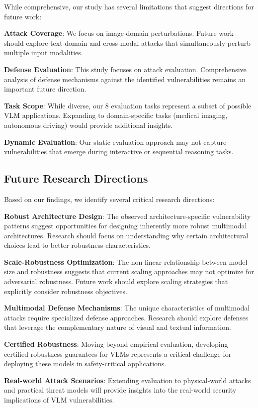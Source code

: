 While comprehensive, our study has several limitations that suggest directions for future work:

\textbf{Attack Coverage}: We focus on image-domain perturbations. Future work should explore text-domain and cross-modal attacks that simultaneously perturb multiple input modalities.

\textbf{Defense Evaluation}: This study focuses on attack evaluation. Comprehensive analysis of defense mechanisms against the identified vulnerabilities remains an important future direction.

\textbf{Task Scope}: While diverse, our 8 evaluation tasks represent a subset of possible VLM applications. Expanding to domain-specific tasks (medical imaging, autonomous driving) would provide additional insights.

\textbf{Dynamic Evaluation}: Our static evaluation approach may not capture vulnerabilities that emerge during interactive or sequential reasoning tasks.

\subsection{Future Research Directions}

Based on our findings, we identify several critical research directions:

\textbf{Robust Architecture Design}: The observed architecture-specific vulnerability patterns suggest opportunities for designing inherently more robust multimodal architectures. Research should focus on understanding why certain architectural choices lead to better robustness characteristics.

\textbf{Scale-Robustness Optimization}: The non-linear relationship between model size and robustness suggests that current scaling approaches may not optimize for adversarial robustness. Future work should explore scaling strategies that explicitly consider robustness objectives.

\textbf{Multimodal Defense Mechanisms}: The unique characteristics of multimodal attacks require specialized defense approaches. Research should explore defenses that leverage the complementary nature of visual and textual information.

\textbf{Certified Robustness}: Moving beyond empirical evaluation, developing certified robustness guarantees for VLMs represents a critical challenge for deploying these models in safety-critical applications.

\textbf{Real-world Attack Scenarios}: Extending evaluation to physical-world attacks and practical threat models will provide insights into the real-world security implications of VLM vulnerabilities.

